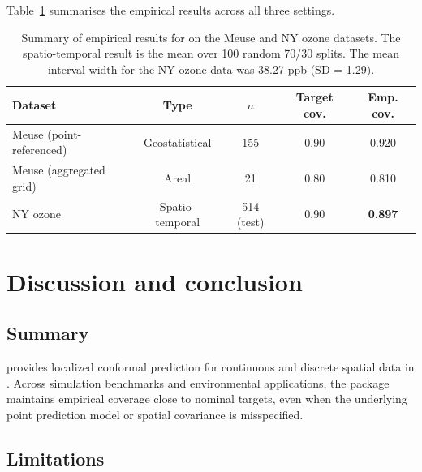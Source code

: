 \documentclass[article]{jss}
\begin{document}
Table~\ref{tab:summary_final} summarises the empirical results across all three settings.

\begin{table}[t!]
\centering
\begin{tabular}{lcccc}
\toprule
Dataset & Type & $n$ & Target cov. & Emp. cov. \\
\midrule
Meuse (point-referenced) & Geostatistical & 155 & 0.90 & 0.920 \\
Meuse (aggregated grid) & Areal & 21 & 0.80 & 0.810 \\
NY ozone & Spatio-temporal & 514 (test) & 0.90 & \textbf{0.897} \\
\bottomrule
\end{tabular}
\caption{Summary of empirical results for  on the Meuse and NY ozone datasets. The spatio-temporal result is the mean over 100 random 70/30 splits. The mean interval width for the NY ozone data was 38.27 ppb (SD = 1.29).}
\label{tab:summary_final}
\end{table}


\section{Discussion and conclusion}\label{sec:discussion}

\subsection{Summary}

 provides localized conformal prediction for continuous and discrete spatial data in . Across simulation benchmarks and environmental applications, the package maintains empirical coverage close to nominal targets, even when the underlying point prediction model or spatial covariance is misspecified.

\subsection{Limitations}
\end{document}
